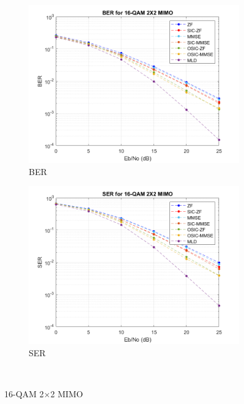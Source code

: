\documentclass{article}
\begin{document}
\begin{figure}[H]
	\centering
	\begin{subfigure}{0.5\textwidth}
		\centerline{\includegraphics[width=1\textwidth]{BER_2x2_16qam2.png}}
		\caption{BER}
	\end{subfigure}%
	\begin{subfigure}{0.5\textwidth}
		\centerline{\includegraphics[width=1\textwidth]{SER_2x2_16qam2.png}}
		\caption{SER}
	\end{subfigure}\\%
	\caption{16-QAM 2$\times$2 MIMO}
\end{figure}
\end{document}
